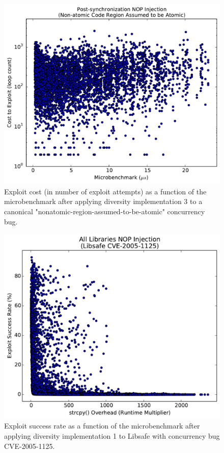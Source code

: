 \begin{figure}
	\centering
	\includegraphics[width=\columnwidth]{figures/nonatomic-post}
	\caption{Exploit cost (in number of exploit attempts) as a function of the microbenchmark after applying diversity implementation 3 to a canonical "nonatomic-region-assumed-to-be-atomic" concurrency bug.}
	\label{fig_nonatomic-post}
\end{figure}

\begin{figure}
	\centering
	\includegraphics[width=\columnwidth]{figures/libsafe-all}
	\caption{Exploit success rate as a function of the microbenchmark after applying diversity implementation 1 to Libsafe with concurrency bug CVE-2005-1125.}
	\label{fig_libsafe-all}
\end{figure}

